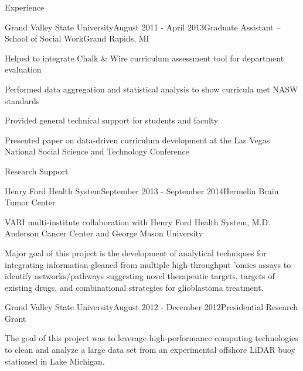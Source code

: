\documentclass{resume} %
\begin{document}
\begin{rSection}{Experience}
\newpage


\begin{rSubsection}{Grand Valley State University}{August 2011 - April 2013}{Graduate Assistant -- School of Social Work}{Grand Rapids, MI}
\item Helped to integrate Chalk \& Wire curriculum assessment tool for department evaluation
\item Performed data aggregation and statistical analysis to show curricula met NASW standards
\item Provided general technical support for students and faculty
\item Presented paper on data-driven curriculum development at the Las Vegas National Social Science and Technology Conference
\end{rSubsection}

\end{rSection}


\begin{rSection}{Research Support}
\begin{rSubsection}{Henry Ford Health System}{September 2013 - September 2014}{Hermelin Brain Tumor Center}{}
\item VARI multi-institute collaboration with Henry Ford Health System, M.D. Anderson Cancer Center and George Mason University
\item Major goal of this project is the development of analytical techniques for integrating information gleaned from multiple high-throughput ’omics assays to identify networks/pathways suggesting novel therapeutic targets, targets of existing drugs, and combinational strategies for glioblastoma treatment.
\end{rSubsection}

\begin{rSubsection}{Grand Valley State University}{August 2012 - December 2012}{Presidential Research Grant}{}
\item The goal of this project was to leverage high-performance computing technologies to clean and analyze a large data set from an experimental offshore LiDAR buoy stationed in Lake Michigan.
\end{rSubsection}

\end{rSection}
\end{document}
